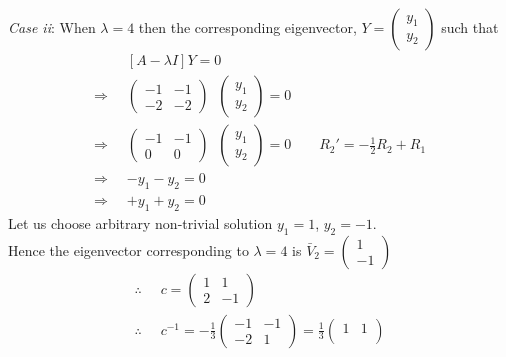 \documentclass[../main-sheet.tex]{subfiles}
\begin{document}
\begin{soln}
    \emph{Case ii}: When \(\lambda=4\) then the corresponding eigenvector, \(\displaystyle Y=\begin{pmatrix}
        y_1\\
        y_2
    \end{pmatrix}\) such that
    \begin{align*}
        &[A-\lambda I]Y=0\\
        \Rightarrow\;\;&\begin{pmatrix}
            -1&-1\\
            -2&-2
        \end{pmatrix}\;\;\begin{pmatrix}
            y_1\\
            y_2
        \end{pmatrix}=0\\
        \Rightarrow\;\;&\begin{pmatrix}
            -1&-1\\
            0&0
        \end{pmatrix}\;\;\begin{pmatrix}
            y_1\\
            y_2
        \end{pmatrix}=0\qquad R_2'=-\frac{1}{2}R_2+R_1\\
        \Rightarrow\;\;&-y_1-y_2=0\\
        \Rightarrow\;\;&+y_1+y_2=0
    \end{align*}
    Let us choose arbitrary non-trivial solution \(y_1=1\), \(y_2=-1\).\\
    Hence the eigenvector corresponding to \(\lambda=4\) is \(\displaystyle \bar{V}_2=\begin{pmatrix}
        1\\
        -1
    \end{pmatrix}\)\\
    \begin{align*}
        \therefore\;\;& c=\begin{pmatrix}
            1 & 1\\
            2 & -1
        \end{pmatrix}\\
        \therefore\;\;& c^{-1}=-\frac{1}{3}\begin{pmatrix}
            -1 & -1\\
            -2 & 1
        \end{pmatrix}=\frac{1}{3}\begin{pmatrix}
            1 & 1\\

\end{pmatrix}
\end{align*}
\end{soln}
\end{document}
